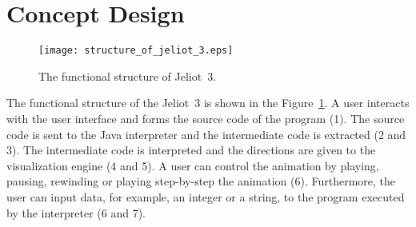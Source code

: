 \section{Concept Design}
\label{sec:Concept_Design}

\begin{figure}[!htb]
\begin{center}
\texttt{[image: structure\_of\_jeliot\_3.eps]}
\caption{The functional structure of Jeliot~3.}
\label{fig:structure_of_jeliot_3}
\end{center}
\end{figure}

The functional structure of the Jeliot~3 is shown in the Figure~\ref{fig:structure_of_jeliot_3}.
A user interacts with the user interface and forms the source code of the program (1).
The source code is sent to the Java interpreter and the intermediate code is extracted (2 and 3).
The intermediate code is interpreted and the directions are given to the visualization engine (4 and 5).
A user can control the animation by playing, pausing, rewinding or playing step-by-step the animation (6).
Furthermore, the user can input data, for example, an integer or a string, to the program executed
by the interpreter (6 and 7).

